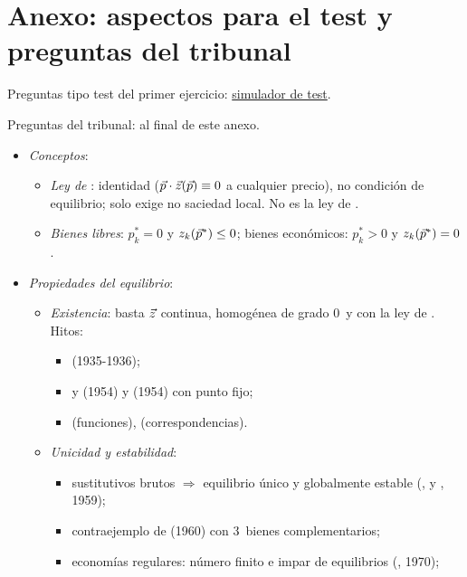 \documentclass[11pt]{article}
\begin{document}
\section{Anexo: aspectos para el test y preguntas del tribunal}\label{anexo:test}

\begin{anotaciones}
Preguntas tipo test del primer ejercicio: \href{https://www.victorgutierrezmarcos.es/oposicion/temario/primer-ejercicio/test/simulador.html?tema=3.A.21}{simulador de test}.

Preguntas del tribunal: al final de este anexo.
\end{anotaciones}

\begin{itemize}
\item \emph{Conceptos}:
  \begin{itemize}
  \item \emph{Ley de }: identidad ($\vec{p}\cdot\vec{z}(\vec{p})\equiv 0$ a cualquier precio), no condición de equilibrio; solo exige no saciedad local. No es la ley de .
  \item \emph{Bienes libres}: $p^*_k=0$ y $z_k(\vec{p}^*)\leq 0$; bienes económicos: $p^*_k>0$ y $z_k(\vec{p}^*)=0$.
  \end{itemize}
\item \emph{Propiedades del equilibrio}:
  \begin{itemize}
  \item \emph{Existencia}: basta $\vec{z}$ continua, homogénea de grado 0~y con la ley de . Hitos:
    \begin{itemize}
    \item {} (1935-1936);
    \item {} y  (1954) y  (1954) con punto fijo;
    \item {} (funciones),  (correspondencias).
    \end{itemize}
  \item \emph{Unicidad y estabilidad}:
    \begin{itemize}
    \item sustitutivos brutos $\Rightarrow$ equilibrio único y globalmente estable (,  y , 1959);
    \item contraejemplo de  (1960) con 3~bienes complementarios;
    \item economías regulares: número finito e impar de equilibrios (, 1970);

\end{itemize}
\end{itemize}
\end{itemize}
\end{document}
